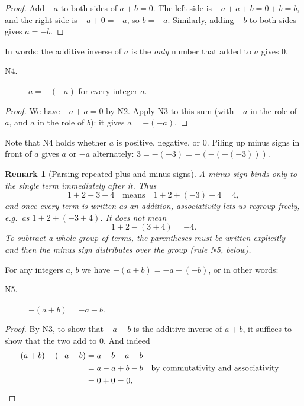 \documentclass[11pt]{article}
\newtheorem*{remark}{Remark}
\begin{document}
\begin{proof}
  Add $-a$ to both sides of $a + b = 0$. The left side is
  $-a + a + b = 0 + b = b$, and the right side is $-a + 0 = -a$, so
  $b = -a$. Similarly, adding $-b$ to both sides gives $a = -b$.
\end{proof}

In words: the additive inverse of $a$ is the \emph{only} number that
added to $a$ gives $0$.

\begin{description}
  \item[N4.] $a = -(-a)$ \quad for every integer $a$.
\end{description}

\begin{proof}
  We have $-a + a = 0$ by N2. Apply N3 to this sum (with $-a$ in the
  role of $a$, and $a$ in the role of $b$): it gives $a = -(-a)$.
\end{proof}

Note that N4 holds whether $a$ is positive, negative, or $0$. Piling up
minus signs in front of $a$ gives $a$ or $-a$ alternately:
$3 = -(-3) = -(-(-(-3)))$.

\begin{remark}[Parsing repeated plus and minus signs]
  A minus sign binds only to the single term immediately after it. Thus
  \[ 1 + 2 - 3 + 4 \quad \text{means} \quad 1 + 2 + (-3) + 4 = 4, \]
  and once every term is written as an addition, associativity lets us
  regroup freely, e.g.\ as $1 + 2 + (-3 + 4)$. It does \emph{not} mean
  \[ 1 + 2 - (3 + 4) = -4. \]
  To subtract a whole group of terms, the parentheses must be written
  explicitly --- and then the minus sign distributes over the group
  (rule N5, below).
\end{remark}

For any integers $a$, $b$ we have $-(a + b) = -a + (-b)$, or in other
words:

\begin{description}
  \item[N5.] $-(a + b) = -a - b$.
\end{description}

\begin{proof}
  By N3, to show that $-a - b$ is the additive inverse of $a + b$, it
  suffices to show that the two add to $0$. And indeed
  \begin{align*}
    (a + b) + (-a - b) &= a + b - a - b \\
                       &= a - a + b - b
                          && \text{by commutativity and associativity} \\
                       &= 0 + 0 = 0. \qedhere
  \end{align*}
\end{proof}
\end{document}
